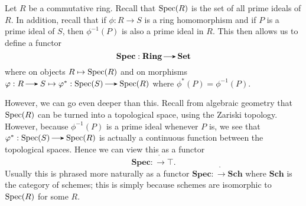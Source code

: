    \begin{example}
        Let $R$ be a commutative ring. Recall that
        $\operatorname{\mathrm{Spec}}(R)$ is the set of all prime ideals of $R$. In addition, recall
        that if $\phi: R \to S$ is a ring homomorphism and  
        if $P$ is a prime ideal of $S$, then $\phi^{-1}(P)$ is also a prime 
        ideal in $R$.
        This then allows us to define a functor 
        \[
            \textbf{Spec}: \ring \to \Set
        \]
        where on objects $R \mapsto \operatorname{\mathrm{Spec}}(R)$ and on morphisms 
        $\phi: R \to S \mapsto \phi^*: \spec(S) \to \spec(R)$ where 
        $\phi^{*}(P) = \phi^{-1}(P)$.

        However, we can go even deeper than this. Recall from algebraic 
        geometry that $\operatorname{\mathrm{Spec}}(R)$ can be turned into a topological space, 
        using the Zariski topology. However, because 
        $\phi^{-1}(P)$ is a prime ideal whenever $P$ is, we see that $\phi^*: 
        \spec(S) \to \spec(R)$ is actually a continuous function between 
        the topological spaces. Hence we can view this 
        as a functor 
        \[
            \textbf{Spec}: \ring \to \top.
        \] 
        Usually this is phrased more naturally as a functor 
        $\textbf{Spec}: \ring \to \textbf{Sch}$
        where $\textbf{Sch}$ is the category of schemes; this is simply 
        because schemes are isomorphic to $\operatorname{\mathrm{Spec}}(R)$ for some $R$.
    \end{example}

